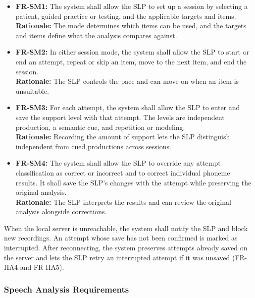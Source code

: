 \documentclass[12pt]{article}
\begin{document}
\begin{itemize}
\item \textbf{FR-SM1:} The system shall allow the SLP to set up a session by selecting a patient, guided practice or testing, and the applicable targets and items. \\\textbf{Rationale:} The mode determines which items can be used, and the targets and items define what the analysis compares against.
\item \textbf{FR-SM2:} In either session mode, the system shall allow the SLP to start or end an attempt, repeat or skip an item, move to the next item, and end the session. \\
\textbf{Rationale:} The SLP controls the pace and can move on when an item is unsuitable.
\item \textbf{FR-SM3:} For each attempt, the system shall allow the SLP to enter and save the support level with that attempt. The levels are independent production, a semantic cue, and repetition or modeling. \\
\textbf{Rationale:} Recording the amount of support lets the SLP distinguish independent from cued productions across sessions.
\item \textbf{FR-SM4:} The system shall allow the SLP to override any attempt classification as correct or incorrect and to correct individual phoneme results. It shall save the SLP's changes with the attempt while preserving the original analysis. \\
\textbf{Rationale:} The SLP interprets the results and can review the original analysis alongside corrections.
\end{itemize}

When the local server is unreachable, the system shall notify the SLP
and block new recordings. An attempt whose save has not been confirmed is
marked as interrupted. After reconnecting, the system preserves attempts
already saved on the server and lets the SLP retry an interrupted attempt
if it was unsaved (FR-HA4 and FR-HA5).

\subsubsection{Speech Analysis Requirements}
\end{document}
